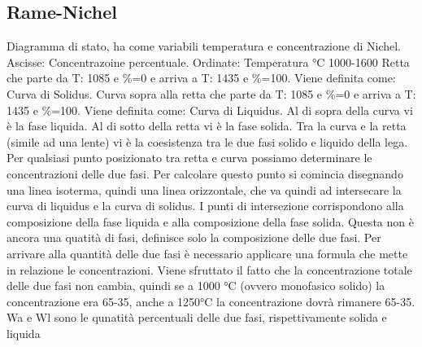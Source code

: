 \documentclass{article}%
\begin{document}
\subsection{ Rame{-}Nichel }%
\label{subsec:Rame{-}Nichel}%
Diagramma di stato, ha come variabili temperatura e concentrazione di Nichel.\newline%
%
Ascisse: Concentrazoine percentuale.\newline%
%
Ordinate: Temperatura °C 1000{-}1600\newline%
%
Retta che parte da T: 1085 e \%=0 e arriva a T: 1435 e \%=100. Viene definita come: Curva di Solidus.\newline%
%
Curva sopra alla retta che parte da T: 1085 e \%=0 e arriva a T: 1435 e \%=100. Viene definita come: Curva di Liquidus.\newline%
%
\newline%
%
Al di sopra della curva vi è la fase liquida.\newline%
%
Al di sotto della retta vi è la fase solida.\newline%
%
\newline%
%
Tra la curva e la retta (simile ad una lente) vi è la coesistenza tra le due fasi solido e liquido della lega.\newline%
%
\newline%
%
Per qualsiasi punto posizionato tra retta e curva possiamo determinare le concentrazioni delle due fasi.\newline%
%
Per calcolare questo punto si comincia disegnando una linea isoterma, quindi una linea orizzontale, che va quindi ad intersecare\newline%
%
la curva di liquidus e la curva di solidus. I punti di intersezione corrispondono alla composizione della fase liquida e alla composizione della fase solida. Questa non è ancora una quatità di fasi, definisce solo la composizione delle due fasi.\newline%
%
Per arrivare alla quantità delle due fasi è necessario applicare una formula che mette in relazione le concentrazioni.\newline%
%
Viene sfruttato il fatto che la concentrazione totale delle due fasi non cambia, quindi se a 1000 °C (ovvero monofasico solido) la concentrazione era 65{-}35, anche a 1250°C la concentrazione dovrà rimanere 65{-}35.\newline%
%
\newline%
%
Wa e Wl sono le qunatità percentuali delle due fasi, rispettivamente solida e liquida\newline%
\end{document}
